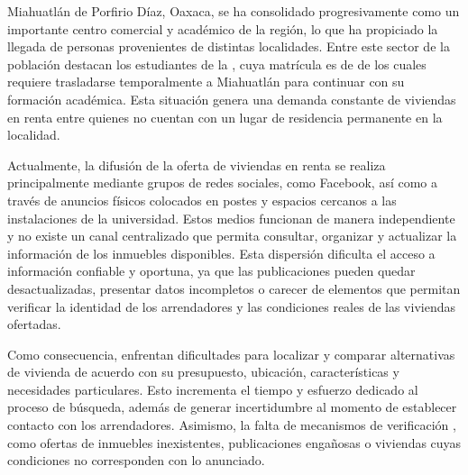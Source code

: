 Miahuatlán de Porfirio Díaz, Oaxaca, se ha consolidado progresivamente como un importante centro comercial y académico de la región, lo que ha propiciado la llegada de personas provenientes de distintas localidades. Entre este sector de la población destacan los estudiantes de la , cuya matrícula es de 
de los cuales 
requiere trasladarse temporalmente a Miahuatlán para continuar con su formación académica. Esta situación genera una demanda constante de viviendas en renta entre quienes no cuentan con un lugar de residencia permanente en la localidad.

Actualmente, la difusión de la oferta de viviendas en renta se realiza principalmente mediante grupos de redes sociales, como Facebook, así como a través de anuncios físicos colocados en postes y espacios cercanos a las instalaciones de la universidad.
 Estos medios funcionan de manera independiente y no existe un canal centralizado que permita consultar, organizar y actualizar la información de los inmuebles disponibles. Esta dispersión dificulta el acceso a información confiable y oportuna, ya que las publicaciones pueden quedar desactualizadas, presentar datos incompletos o carecer de elementos que permitan verificar la identidad de los arrendadores y las condiciones reales de las viviendas ofertadas.

Como consecuencia,  enfrentan dificultades para localizar y comparar alternativas de vivienda de acuerdo con su presupuesto, ubicación, características y necesidades particulares. Esto incrementa el tiempo y esfuerzo dedicado al proceso de búsqueda, además de generar incertidumbre al momento de establecer contacto con los arrendadores. Asimismo, la falta de mecanismos de verificación , como ofertas de inmuebles inexistentes, publicaciones engañosas o viviendas cuyas condiciones no corresponden con lo anunciado.


